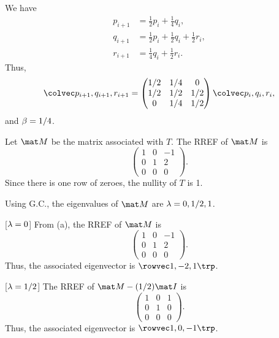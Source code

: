 \begin{solution}
    \begin{ppart}
        We have
        \begin{align*}
            p_{i+1} &= \frac12 p_i + \frac14 q_i,\\
            q_{i+1} &= \frac12 p_i + \frac12 q_i + \frac12 r_i,\\
            r_{i+1} &= \frac14 q_i + \frac12 r_i.
        \end{align*}
        Thus, \[\cveciii{p_{i+1}}{q_{i+1}}{r_{i+1}} = \begin{pmatrix}1/2 & 1/4 & 0 \\ 1/2 & 1/2 & 1/2 \\ 0 & 1/4 & 1/2\end{pmatrix} \cveciii{p_i}{q_i}{r_i},\] and $\beta = 1/4$.

        Let $\mat M$ be the matrix associated with $T$. The RREF of $\mat M$ is \[\begin{pmatrix}1 & 0 & -1 \\ 0 & 1 & 2 \\ 0 & 0 & 0\end{pmatrix}.\] Since there is one row of zeroes, the nullity of $T$ is 1.
    \end{ppart}
    \begin{ppart}
        Using G.C., the eigenvalues of $\mat M$ are $\lambda = 0, 1/2, 1$.

        [$\lambda = 0$] From (a), the RREF of $\mat M$ is \[\begin{pmatrix}1 & 0 & -1 \\ 0 & 1 & 2 \\ 0 & 0 & 0\end{pmatrix}.\] Thus, the associated eigenvector is $\cveciiix1{-2}1$.

        [$\lambda = 1/2$] The RREF of $\mat M - (1/2)\mat I$ is \[\begin{pmatrix}1 & 0 & 1 \\ 0 & 1 & 0 \\ 0 & 0 & 0\end{pmatrix}.\] Thus, the associated eigenvector is $\cveciiix10{-1}$.


\end{ppart}
\end{solution}
